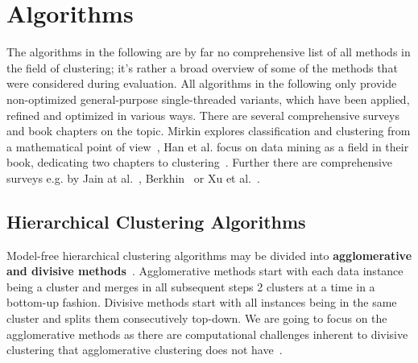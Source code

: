 \chapter{Algorithms}\label{\positionnumber}
The algorithms in the following are by far no comprehensive list of all methods in the field of clustering; it's rather a broad overview of some of the methods that were considered during evaluation. All algorithms in the following only provide non-optimized general-purpose single-threaded variants, which have been applied, refined and optimized in various ways. There are several comprehensive surveys and book chapters on the topic. Mirkin explores classification and clustering from a mathematical point of view~\cite{mirkin2013mathematical}, Han et al. focus on data mining as a field in their book, dedicating two chapters to clustering~\cite{han2011data}. Further there are comprehensive surveys e.g. by Jain at al.~\cite{overview_clust}, Berkhin~\cite{berkhin2006survey} or Xu et al.~\cite{xu2005survey}. 


\section{Hierarchical Clustering Algorithms}\label{\positionnumber}
Model-free hierarchical clustering algorithms may be divided into \textbf{agglomerative and divisive methods}~\cite{han2011data}. Agglomerative methods start with each data instance being a cluster and merges in all subsequent steps 2 clusters at a time in a bottom-up fashion. Divisive methods start with all instances being in the same cluster and splits them consecutively top-down. We are going to focus on the agglomerative methods as there are computational challenges inherent to divisive clustering that agglomerative clustering does not have~\cite{han2011data}. \\

